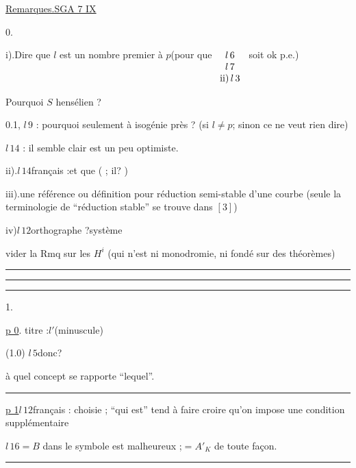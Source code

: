 
\uline{Remarques.\qquad SGA 7 IX}

0.

i).\quad Dire que $l$ est un nombre premier à $p$\quad (pour que $\begin{array}[t]{c}l\,6\\l\,7\\\mathrm{ii)}\,l\,3\end{array}$ soit ok p.e.)

Pourquoi $S$ hensélien ?

0.1, $l\,9$ : pourquoi seulement à isogénie près ? (si $l\ne p$;\deleted{\unsure{)}} sinon ce ne veut rien dire)

$l\,14$ : il semble clair \qquad est un peu optimiste.

ii).\quad $l\,14$\qquad français :\qquad et que \qquad ( ; il\qquad ? )

iii).\quad {}\qquad une référence ou définition pour réduction semi-stable d'une courbe (seule la terminologie de ``réduction stable'' se trouve dans $[3]$)

iv)\quad $l\,12$\qquad orthographe ?\qquad système

\qquad vider la Rmq sur les $H^i$ (qui n'est ni monodromie, ni fondé sur des théorèmes)

\hrule\smallskip\hrule\smallskip\hrule

1.

\uline{p 0}. titre :\qquad $l'$\quad (minuscule)

(1.0) $l\,5$\qquad donc\qquad ?

\qquad à quel concept se rapporte ``lequel''.

\hrule

\uline{p 1}\quad $l\,12$\qquad français : choisie \qquad ; ``qui est'' tend à faire croire qu'on impose une condition supplémentaire

$l\,16$\qquad $=B$ dans le symbole est malheureux ;\quad $=A'_K$ de toute façon.

\hrule

